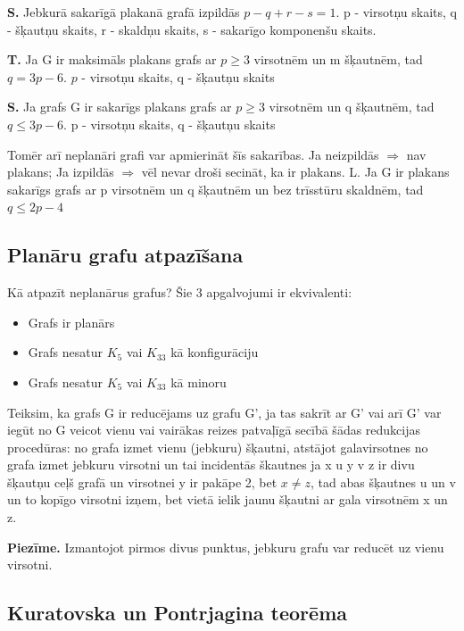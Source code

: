 \documentclass{article}
\begin{document}
\textbf{S. } Jebkurā sakarīgā plakanā grafā izpildās $p − q + r − s = 1$.  p - virsotņu skaits, q - šķautņu skaits, r - skaldņu skaits, s - sakarīgo komponenšu skaits.

\textbf{T.}  Ja G ir maksimāls plakans grafs ar $p \ge 3$ virsotnēm un m šķautnēm, tad $q = 3p − 6$.  $p$ - virsotņu skaits, q - šķautņu skaits

\textbf{S. } Ja grafs G ir sakarīgs plakans grafs ar $p \ge 3$ virsotnēm un q šķautnēm, tad $q \le 3p − 6$.  p - virsotņu skaits, q - šķautņu skaits

Tomēr arī neplanāri grafi var apmierināt šīs sakarības.  Ja neizpildās $\Rightarrow$ nav plakans; Ja izpildās $\Rightarrow$ vēl nevar droši secināt, ka ir plakans. L.  Ja G ir plakans sakarīgs grafs ar p virsotnēm un q šķautnēm un bez trīsstūru skaldnēm, tad $q \le 2p − 4$

\subsection{Planāru grafu atpazīšana}

Kā atpazīt neplanārus grafus?
Šie 3 apgalvojumi ir ekvivalenti:
\begin{itemize}
	\item Grafs ir planārs
	\item Grafs nesatur $K_5$ vai $K_{33}$ kā konfigurāciju
	\item Grafs nesatur $K_5$ vai $K_{33}$ kā minoru
\end{itemize}

Teiksim, ka grafs G ir reducējams uz grafu G', ja tas sakrīt ar G' vai arī G' var iegūt no G veicot vienu vai vairākas reizes patvaļīgā secībā šādas redukcijas procedūras: no grafa izmet vienu (jebkuru) šķautni, atstājot galavirsotnes no grafa izmet jebkuru virsotni un tai incidentās škautnes ja x u y v z ir divu šķautņu ceļš grafā un virsotnei y ir pakāpe 2, bet $x \ne z$, tad abas šķautnes u un v un to kopīgo virsotni izņem, bet vietā ielik jaunu šķautni ar gala virsotnēm x un z.

\textbf{Piezīme.} Izmantojot pirmos divus punktus, jebkuru grafu var reducēt uz vienu virsotni.

\subsection{Kuratovska un Pontrjagina teorēma}
\end{document}
